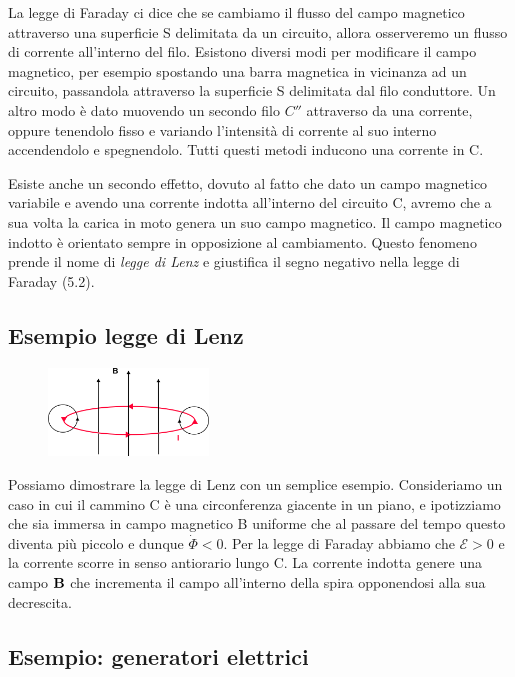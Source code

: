 \noindent La legge di Faraday ci dice che se cambiamo il flusso del campo magnetico attraverso una superficie S delimitata da un circuito, allora osserveremo un flusso di corrente all'interno del filo. Esistono diversi modi per modificare il campo magnetico, per esempio spostando una barra magnetica in vicinanza ad un circuito, passandola attraverso la superficie S delimitata dal filo conduttore. Un altro modo \`e dato muovendo un secondo filo $C''$ attraverso da una corrente, oppure tenendolo fisso e variando l'intensit\`a di corrente al suo interno accendendolo e spegnendolo. Tutti questi metodi inducono una corrente in C.
\newline

Esiste anche un secondo effetto, dovuto al fatto che dato un campo magnetico variabile e avendo una corrente indotta all'interno del circuito C, avremo che a sua volta la carica in moto genera un suo campo magnetico. Il campo magnetico indotto \`e orientato sempre in opposizione al cambiamento. Questo fenomeno prende il nome di \textit{legge di Lenz} e giustifica il segno negativo nella legge di Faraday (5.2). 

\subsection{Esempio legge di Lenz}

\begin{figure} %
    \centering
    \includegraphics[width=0.38\textwidth]{images/lenz_law}
\end{figure}
Possiamo dimostrare la legge di Lenz con un semplice esempio. Consideriamo un caso in cui il cammino C \`e una circonferenza giacente in un piano, e ipotizziamo che sia immersa in campo magnetico B uniforme che al passare del tempo questo diventa pi\`u piccolo e dunque $\dot{\Phi} < 0$. Per la legge di Faraday abbiamo che $\mathcal{E} > 0 $ e la corrente scorre in senso antiorario lungo C. La corrente indotta genere una campo $\bold{B}$ che incrementa il campo all'interno della spira opponendosi alla sua decrescita.

\subsection{Esempio: generatori elettrici}


 